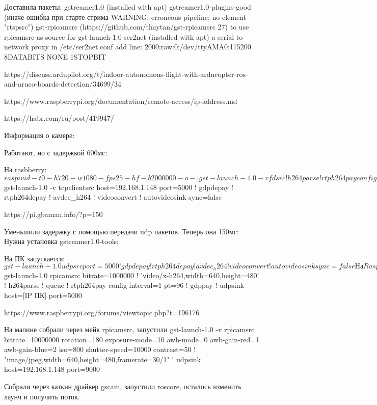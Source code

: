 \begin{MyCode}
	Доставила пакеты:
	gstreamer1.0 (installed with apt)
	gstreamer1.0-plugins-good (иначе ошибка при старте стрима WARNING: erroneous pipeline: no element "rtspsrc")
	gst-rpicamsrc (https://github.com/thaytan/gst-rpicamsrc 27) to use rpicamsrc as source for gst-launch-1.0
	ser2net (installed with apt) a serial to network proxy
	in /etc/ser2net.conf add line:
	2000:raw:0:/dev/ttyAMA0:115200 8DATABITS NONE 1STOPBIT
\end{MyCode}
https://discuss.ardupilot.org/t/indoor-autonomous-flight-with-arducopter-ros-and-aruco-boards-detection/34699/34

https://www.raspberrypi.org/documentation/remote-access/ip-address.md

https://habr.com/ru/post/419947/

Информация о камере:

Работают, но с задержкой 600мс:
\begin{MyCode}
На rasbberry:
$ raspivid -t 0 -h 720 -w 1080 -fps 25 -hf -b 2000000 -o - | gst-launch-1.0 -v fdsrc ! h264parse !  rtph264pay config-interval=1 pt=96 ! gdppay ! tcpserversink host=192.168.1.148 port=5000 

На ПК: 
$ gst-launch-1.0 -v tcpclientsrc host=192.168.1.148 port=5000  ! gdpdepay !  rtph264depay ! avdec_h264 ! videoconvert ! autovideosink sync=false

https://pi.gbaman.info/?p=150
\end{MyCode}

Уменьшили задержку с помощью передачи udp пакетов. Теперь она 150мс:
Нужна установка gstreamer1.0-tools;
\begin{MyCode}
На ПК запускается:
$ gst-launch-1.0 udpsrc port=5000 ! gdpdepay ! rtph264depay ! avdec_h264 ! videoconvert ! autovideosink sync=false

На Raspberry:
$ gst-launch-1.0 rpicamsrc bitrate=1000000 ! 'video/x-h264,width=640,height=480' ! h264parse ! queue ! rtph264pay config-interval=1 pt=96 ! gdppay ! udpsink host=[IP ПК] port=5000

https://www.raspberrypi.org/forums/viewtopic.php?t=196176
\end{MyCode}

На малине собрали через мейк rpicamsrc,
запустили gst-launch-1.0 -v rpicamsrc bitrate=10000000 rotation=180 exposure-mode=10 awb-mode=0 awb-gain-red=1 awb-gain-blue=2 iso=800 shutter-speed=10000 contrast=50 ! "image/jpeg,width=640,height=480,framerate=30/1" ! udpsink host=192.168.1.148 port=9000


Собрали через каткин драйвер gscam, запустили roscore, осталось изменить лаунч и получить поток.
